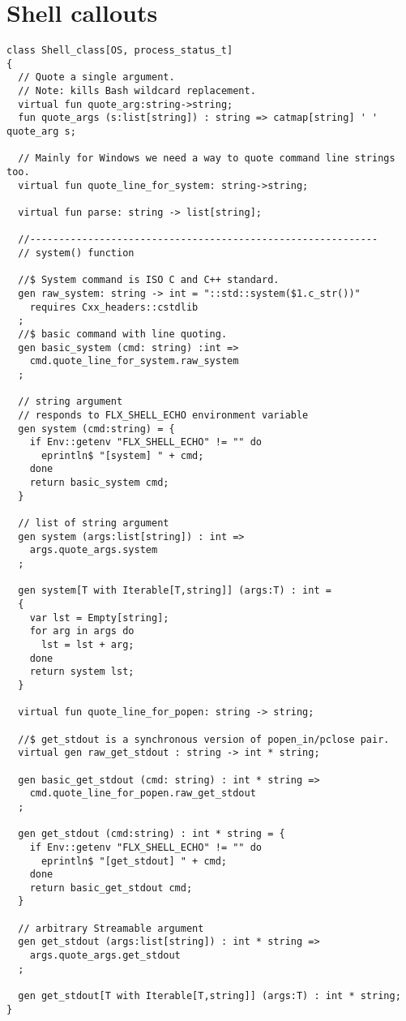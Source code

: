 \documentclass[oneside]{book}
\begin{document}
\section{Shell callouts}
\begin{verbatim}
class Shell_class[OS, process_status_t]
{
  // Quote a single argument.
  // Note: kills Bash wildcard replacement.
  virtual fun quote_arg:string->string;
  fun quote_args (s:list[string]) : string => catmap[string] ' ' quote_arg s;

  // Mainly for Windows we need a way to quote command line strings too.
  virtual fun quote_line_for_system: string->string;

  virtual fun parse: string -> list[string];

  //------------------------------------------------------------
  // system() function

  //$ System command is ISO C and C++ standard.
  gen raw_system: string -> int = "::std::system($1.c_str())"
    requires Cxx_headers::cstdlib
  ;
  //$ basic command with line quoting.
  gen basic_system (cmd: string) :int => 
    cmd.quote_line_for_system.raw_system
  ;

  // string argument
  // responds to FLX_SHELL_ECHO environment variable
  gen system (cmd:string) = {
    if Env::getenv "FLX_SHELL_ECHO" != "" do
      eprintln$ "[system] " + cmd;
    done
    return basic_system cmd;
  }

  // list of string argument
  gen system (args:list[string]) : int =>
    args.quote_args.system
  ;

  gen system[T with Iterable[T,string]] (args:T) : int =
  {
    var lst = Empty[string];
    for arg in args do 
      lst = lst + arg; 
    done
    return system lst;
  }  

  virtual fun quote_line_for_popen: string -> string;

  //$ get_stdout is a synchronous version of popen_in/pclose pair.
  virtual gen raw_get_stdout : string -> int * string;
 
  gen basic_get_stdout (cmd: string) : int * string =>
    cmd.quote_line_for_popen.raw_get_stdout
  ;

  gen get_stdout (cmd:string) : int * string = {
    if Env::getenv "FLX_SHELL_ECHO" != "" do
      eprintln$ "[get_stdout] " + cmd;
    done
    return basic_get_stdout cmd;
  }

  // arbitrary Streamable argument
  gen get_stdout (args:list[string]) : int * string =>
    args.quote_args.get_stdout
  ;
 
  gen get_stdout[T with Iterable[T,string]] (args:T) : int * string;
}
\end{verbatim}
\end{document}
